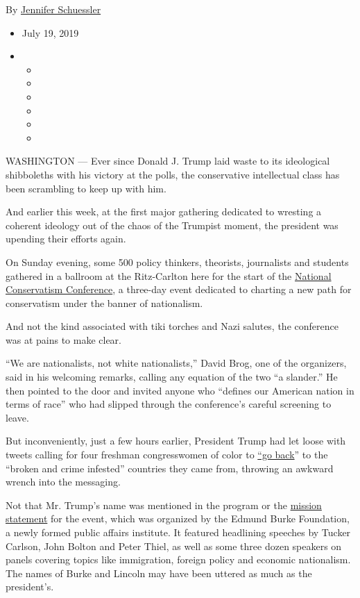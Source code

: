 By
\href{https://www.nytimes3xbfgragh.onion/by/jennifer-schuessler}{Jennifer
Schuessler}

\begin{itemize}
\item
  July 19, 2019
\item
  \begin{itemize}
  \item
  \item
  \item
  \item
  \item
  \item
  \end{itemize}
\end{itemize}

WASHINGTON --- Ever since Donald J. Trump laid waste to its ideological
shibboleths with his victory at the polls, the conservative intellectual
class has been scrambling to keep up with him.

And earlier this week, at the first major gathering dedicated to
wresting a coherent ideology out of the chaos of the Trumpist moment,
the president was upending their efforts again.

On Sunday evening, some 500 policy thinkers, theorists, journalists and
students gathered in a ballroom at the Ritz-Carlton here for the start
of the \href{https://nationalconservatism.org/}{National Conservatism
Conference}, a three-day event dedicated to charting a new path for
conservatism under the banner of nationalism.

And not the kind associated with tiki torches and Nazi salutes, the
conference was at pains to make clear.

``We are nationalists, not white nationalists,'' David Brog, one of the
organizers, said in his welcoming remarks, calling any equation of the
two ``a slander.'' He then pointed to the door and invited anyone who
``defines our American nation in terms of race'' who had slipped through
the conference's careful screening to leave.

But inconveniently, just a few hours earlier, President Trump had let
loose with tweets calling for four freshman congresswomen of color to
\href{http://www.apple.com/}{``go back}'' to the ``broken and crime
infested'' countries they came from, throwing an awkward wrench into the
messaging.

Not that Mr. Trump's name was mentioned in the program or the
\href{https://nationalconservatism.org/about/}{mission statement} for
the event, which was organized by the Edmund Burke Foundation, a newly
formed public affairs institute. It featured headlining speeches by
Tucker Carlson, John Bolton and Peter Thiel, as well as some three dozen
speakers on panels covering topics like immigration, foreign policy and
economic nationalism. The names of Burke and Lincoln may have been
uttered as much as the president's.

